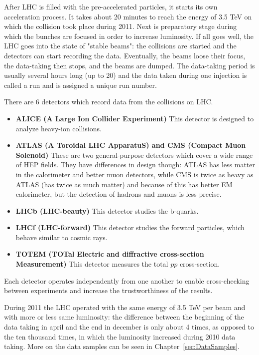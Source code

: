 After LHC is filled with the pre-accelerated particles, it starts its own acceleration process. It takes about 20 minutes to reach the energy of 3.5 TeV on which the collision took place during 2011. Next is preparatory stage during which the bunches are focused in order to increase luminosity. If all goes well, the LHC goes into the state of "stable beams": the collisions are started and the detectors can start recording the data. Eventually, the beams loose their focus, the data-taking then stops, and the beams are dumped. The data-taking period is usually several hours long (up to 20) and the data taken during one injection is called a run and is assigned a unique run number.

There are 6 detectors which record data from the collisions on LHC.
\begin{itemize}
\item {\bfseries ALICE (A Large Ion Collider Experiment)} This detector is designed to analyze heavy-ion collisions.
\item {\bfseries ATLAS (A Toroidal LHC ApparatuS) and CMS (Compact Muon Solenoid)} These are two general-purpose detectors which cover a wide range of HEP fields. They have differences in design though: ATLAS has less matter in the calorimeter and better muon detectors, while CMS is twice as heavy as ATLAS (has twice as much matter) and because of this has better EM calorimeter, but the detection of hadrons and muons is less precise.
\item {\bfseries LHCb (LHC-beauty)} This detector studies the b-quarks.
\item {\bfseries LHCf (LHC-forward)} This detector studies the forward particles, which behave similar to cosmic rays.
\item {\bfseries TOTEM (TOTal Electric and diffractive cross-section Measurement)} This detector measures the total $pp$ cross-section.
\end{itemize}

Each detector operates independently from one another to enable cross-checking between experiments and increase the trustworthiness of the results.

During 2011 the LHC operated with the same energy of 3.5 TeV per beam and with more or less same luminosity: the difference between the beginning of the data taking in april and the end in december is only about 4 times, as opposed to the ten thousand times, in which the luminosity increased during 2010 data taking. More on the data samples can be seen in Chapter~\ref{sec:DataSamples}.
